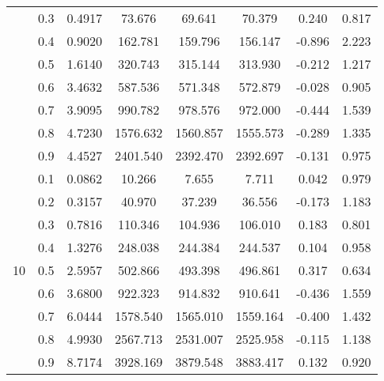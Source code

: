 \documentclass[11pt,a4paper]{report}
\begin{document}
\begin{longtable}{ | c | c || c | c | c | c | c | c | }
 & 0.3 & 0.4917 & 73.676 & 69.641 & 70.379 & 0.240 & 0.817 \\
 & 0.4 & 0.9020 & 162.781 & 159.796 & 156.147 & -0.896 & 2.223 \\
 & 0.5 & 1.6140 & 320.743 & 315.144 & 313.930 & -0.212 & 1.217 \\
 & 0.6 & 3.4632 & 587.536 & 571.348 & 572.879 & -0.028 & 0.905 \\
 & 0.7 & 3.9095 & 990.782 & 978.576 & 972.000 & -0.444 & 1.539 \\
 & 0.8 & 4.7230 & 1576.632 & 1560.857 & 1555.573 & -0.289 & 1.335 \\
 & 0.9 & 4.4527 & 2401.540 & 2392.470 & 2392.697 & -0.131 & 0.975 \\
 \hline
\multirow{9}{*}{10} & 0.1 & 0.0862 & 10.266 & 7.655 & 7.711 & 0.042 & 0.979 \\
 & 0.2 & 0.3157 & 40.970 & 37.239 & 36.556 & -0.173 & 1.183 \\
 & 0.3 & 0.7816 & 110.346 & 104.936 & 106.010 & 0.183 & 0.801 \\
 & 0.4 & 1.3276 & 248.038 & 244.384 & 244.537 & 0.104 & 0.958 \\
 & 0.5 & 2.5957 & 502.866 & 493.398 & 496.861 & 0.317 & 0.634 \\
 & 0.6 & 3.6800 & 922.323 & 914.832 & 910.641 & -0.436 & 1.559 \\
 & 0.7 & 6.0444 & 1578.540 & 1565.010 & 1559.164 & -0.400 & 1.432 \\
 & 0.8 & 4.9930 & 2567.713 & 2531.007 & 2525.958 & -0.115 & 1.138 \\
 & 0.9 & 8.7174 & 3928.169 & 3879.548 & 3883.417 & 0.132 & 0.920 \\
 \hline
\hline
\end{longtable}
\end{document}
